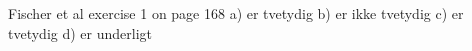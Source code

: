 Fischer et al exercise 1 on page 168
a) er tvetydig
b) er ikke tvetydig
c) er tvetydig
d) er underligt